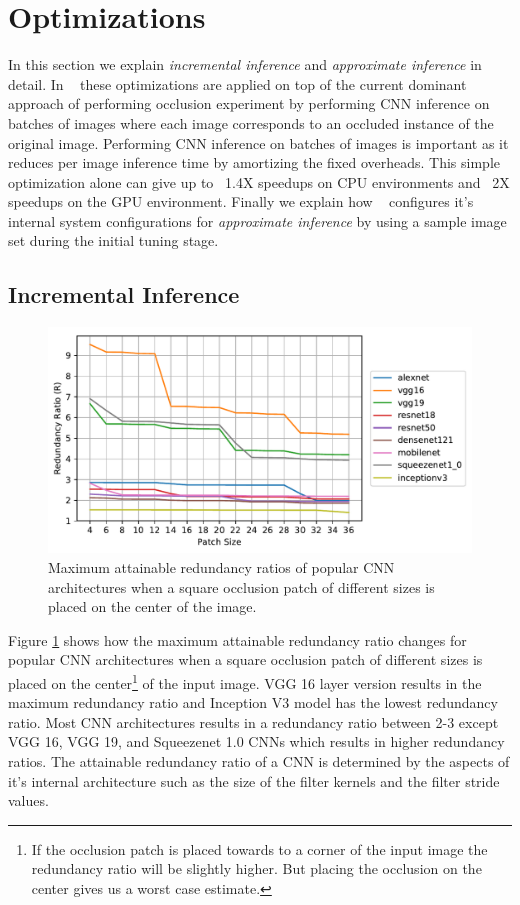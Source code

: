 \section{Optimizations}

In this section we explain \textit{incremental inference} and \textit{approximate inference} in detail.
In \system~ these optimizations are applied on top of the current dominant approach of performing occlusion experiment by performing CNN inference on batches of images where each image corresponds to an occluded instance of the original image.
Performing CNN inference on batches of images is important as it reduces per image inference time by amortizing the fixed overheads.
This simple optimization alone can give up to ~1.4X speedups on CPU environments and ~2X speedups on the GPU environment.
Finally we explain how \system~ configures it's internal system configurations for \textit{approximate inference} by using a sample image set during the initial tuning stage. 

\subsection{Incremental Inference}\label{sec:inc_computation}

\begin{figure}[t]
\includegraphics[width=\columnwidth]{images/redundancy_ratio}
\caption{Maximum attainable redundancy ratios of popular CNN architectures when a square occlusion patch of different sizes is placed on the center of the image.}
\label{fig:redundancy_ratio}
\end{figure}

Figure \ref{fig:redundancy_ratio} shows how the maximum attainable redundancy ratio changes for popular CNN architectures when a square occlusion patch of different sizes is placed on the center\footnote{If the occlusion patch is placed towards to a corner of the input image the redundancy ratio will be slightly higher. But placing the occlusion on the center gives us a worst case estimate.} of the input image. VGG 16 layer version results in the maximum redundancy ratio and Inception V3 model has the lowest redundancy ratio. Most CNN architectures results in a redundancy ratio between 2-3 except VGG 16, VGG 19, and Squeezenet 1.0 CNNs which results in higher redundancy ratios. The attainable redundancy ratio of a CNN is determined by the aspects of it's internal architecture such as the size of the filter kernels and the filter stride values.

